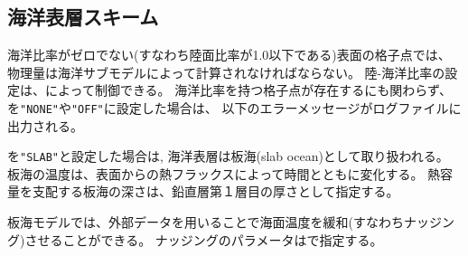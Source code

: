 \subsection{海洋表層スキーム}

海洋比率がゼロでない(すなわち陸面比率が1.0以下である)表面の格子点では、
物理量は海洋サブモデルによって計算されなければならない。
陸-海洋比率の設定は、によって制御できる。
海洋比率を持つ格子点が存在するにも関わらず、
を\verb|"NONE"|や\verb|"OFF"|に設定した場合は、
以下のエラーメッセージがログファイルに出力される。

を\verb|"SLAB"|と設定した場合は, 海洋表層は板海(slab ocean)として取り扱われる。
板海の温度は、表面からの熱フラックスによって時間とともに変化する。
熱容量を支配する板海の深さは、鉛直層第１層目の厚さとして指定する。


板海モデルでは、外部データを用いることで海面温度を緩和(すなわちナッジング)させることができる。
ナッジングのパラメータはで指定する。

